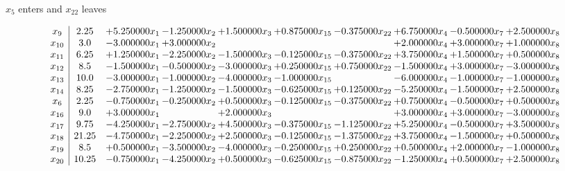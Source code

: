 \documentclass[10pt]{article}
\begin{document}
 $ x_{5} $ enters and $ x_{22} $ leaves 

 \[\begin{array}{c| c c@{\hskip 2pt} c@{\hskip 2pt} c@{\hskip 2pt} c@{\hskip 2pt} c@{\hskip 2pt} c@{\hskip 2pt} c@{\hskip 2pt} c@{\hskip 2pt} }
 x_{9}   &  2.25 & + 5.250000 x_{1} & -1.250000 x_{2} & + 1.500000 x_{3} & + 0.875000 x_{15} & -0.375000 x_{22} & + 6.750000 x_{4} & -0.500000 x_{7} & + 2.500000 x_{8}\\
 x_{10}   &  3.0 & -3.000000 x_{1} & + 3.000000 x_{2} &    &    &   & + 2.000000 x_{4} & + 3.000000 x_{7} & + 1.000000 x_{8}\\
 x_{11}   &  6.25 & + 1.250000 x_{1} & -2.250000 x_{2} & -1.500000 x_{3} & -0.125000 x_{15} & -0.375000 x_{22} & + 3.750000 x_{4} & + 1.500000 x_{7} & + 0.500000 x_{8}\\
 x_{12}   &  8.5 & -1.500000 x_{1} & -0.500000 x_{2} & -3.000000 x_{3} & + 0.250000 x_{15} & + 0.750000 x_{22} & -1.500000 x_{4} & + 3.000000 x_{7} & -3.000000 x_{8}\\
 x_{13}   &  10.0 & -3.000000 x_{1} & -1.000000 x_{2} & -4.000000 x_{3} & -1.000000 x_{15} &   & -6.000000 x_{4} & -1.000000 x_{7} & -1.000000 x_{8}\\
 x_{14}   &  8.25 & -2.750000 x_{1} & -1.250000 x_{2} & -1.500000 x_{3} & -0.625000 x_{15} & + 0.125000 x_{22} & -5.250000 x_{4} & -1.500000 x_{7} & + 2.500000 x_{8}\\
 x_{6}   &  2.25 & -0.750000 x_{1} & -0.250000 x_{2} & + 0.500000 x_{3} & -0.125000 x_{15} & -0.375000 x_{22} & + 0.750000 x_{4} & -0.500000 x_{7} & + 0.500000 x_{8}\\
 x_{16}   &  9.0 & + 3.000000 x_{1} &   & + 2.000000 x_{3} &    &   & + 3.000000 x_{4} & + 3.000000 x_{7} & -3.000000 x_{8}\\
 x_{17}   &  9.75 & -4.250000 x_{1} & -2.750000 x_{2} & + 4.500000 x_{3} & -0.375000 x_{15} & -1.125000 x_{22} & + 5.250000 x_{4} & -0.500000 x_{7} & + 3.500000 x_{8}\\
 x_{18}   &  21.25 & -4.750000 x_{1} & -2.250000 x_{2} & + 2.500000 x_{3} & -0.125000 x_{15} & -1.375000 x_{22} & + 3.750000 x_{4} & -1.500000 x_{7} & + 0.500000 x_{8}\\
 x_{19}   &  8.5 & + 0.500000 x_{1} & -3.500000 x_{2} & -4.000000 x_{3} & -0.250000 x_{15} & + 0.250000 x_{22} & + 0.500000 x_{4} & + 2.000000 x_{7} & -1.000000 x_{8}\\
 x_{20}   &  10.25 & -0.750000 x_{1} & -4.250000 x_{2} & + 0.500000 x_{3} & -0.625000 x_{15} & -0.875000 x_{22} & -1.250000 x_{4} & + 0.500000 x_{7} & + 2.500000 x_{8}\\

\end{array}\]
\end{document}
